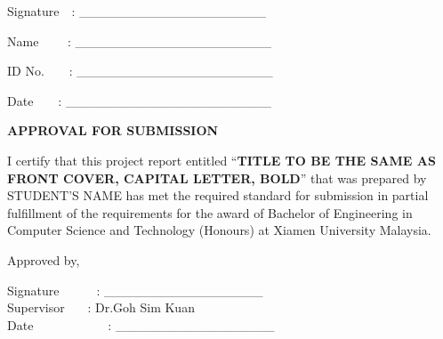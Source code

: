 \documentclass[12pt, a4paper]{report}
\begin{document}
	\begin{RaggedRight}
		Signature\ \ : \_\_\_\_\_\_\_\_\_\_\_\_\_\_\_\_\_\_\_\_\
		
		Name \ \ \ \ : \_\_\_\_\_\_\_\_\_\_\_\_\_\_\_\_\_\_\_\_\_
		
		ID No.\ \ \ \ : \_\_\_\_\_\_\_\_\_\_\_\_\_\_\_\_\_\_\_\_\_
		
		Date\ \ \ \ : \_\_\_\_\_\_\_\_\_\_\_\_\_\_\_\_\_\_\_\_\_\_
		
	\end{RaggedRight}
	
	
	
	
	
	
	
	
	
	
	
	
	
	
	\newpage
	\textbf{APPROVAL FOR SUBMISSION}
	
	
	\vspace{4cm}
	
	\begin{justify}
		{
			
			I certify that this project report entitled “\textbf{TITLE TO BE THE SAME AS FRONT COVER, CAPITAL LETTER, BOLD}” that was prepared by STUDENT’S NAME has met the required standard for submission in partial fulfillment of the requirements for the award of Bachelor of Engineering in Computer Science and Technology (Honours) at Xiamen University Malaysia.
			
			\vspace{3cm}
			\RaggedRight
			Approved by,
			\vspace{4cm}
			
		}
	\end{justify}
	\begin{RaggedRight}
		Signature\ \ \ \ \ \ : \_\_\_\_\_\_\_\_\_\_\_\_\_\_\_\_\_\
		\\
		Supervisor \ \ \ : Dr.Goh Sim Kuan          %
		\\
		Date\ \ \ \ \ \ \ \ \ \ \ \  : \_\_\_\_\_\_\_\_\_\_\_\_\_\_\_\_\_
		\\
		
	\end{RaggedRight}
	
	
	
	
	
	
	
	
	
	
	
	
	
\end{document}
